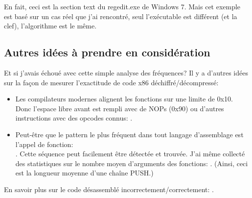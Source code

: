 En fait, ceci est la section text du regedit.exe de Windows 7.
Mais cet exemple est basé sur un cas réel que j'ai rencontré, seul l'exécutable est
différent (et la clef), l'algorithme est le même.

\subsection{Autres idées à prendre en considération}

Et si j'avais échoué avec cette simple analyse des fréquences?
Il y a d'autres idées sur la façon de mesurer l'exactitude de code x86 déchiffré/décompressé:

\begin{itemize}

\item Les compilateurs modernes alignent les fonctions sur une limite de 0x10.
Donc l'espace libre avant est rempli avec de NOPs (0x90) ou d'autres instructions
avec des opcodes connus: .

\item Peut-être que le pattern le plus fréquent dans tout langage d'assemblage est
l'appel de fonction:\\
.
Cette séquence peut facilement être détectée et trouvée.
J'ai même collecté des statistiques sur le nombre moyen d'arguments des fonctions: .
(Ainsi, ceci est la longueur moyenne d'une chaîne PUSH.)

\end{itemize}

En savoir plus sur le code désassemblé incorrectement/correctement: .


